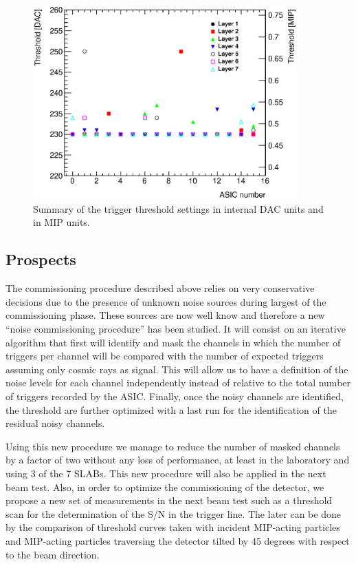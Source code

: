 \documentclass[a4paper,11pt]{article}
\begin{document}
\begin{figure}[!t]
  \centering
  \includegraphics[width=4in]{../figs/commissioning/threshold_chip.eps}
  \caption{Summary of the trigger threshold settings in internal DAC units and in MIP units.}
\label{trigger_thresholds}
\end{figure}


\subsection{Prospects}
\label{sec:comm_prospects}

The commissioning procedure described above relies on very conservative decisions
due to the presence of unknown noise sources during largest of the commissioning phase.
These sources are
now well know and therefore a new ``noise commissioning procedure'' has been studied.
It will consist on an iterative algorithm that first
will identify and mask the channels
in which the number of triggers per channel will be compared with the number of expected triggers
assuming only cosmic rays as signal. This will allow us to have a
definition of the noise levels for each channel independently
instead of relative to the total number of triggers recorded by
the ASIC. Finally, once the noisy channels
are identified, the threshold  are further optimized
with a last run for the identification of the residual noisy channels.

Using this new procedure we manage to reduce the number of masked channels by a factor of two
without any loss of performance, at least in the laboratory and using 3 of the 7 SLABs.
This new procedure will also be applied in the next beam test.
Also, in order to
optimize the commissioning of the detector,
we propose a new set of measurements in the next beam test such as
a threshold scan for the determination of the S/N in the trigger line. The later
can be done by the comparison of threshold curves taken with incident MIP-acting particles
and MIP-acting particles traversing the detector tilted by 45 degrees with respect to the beam direction.
\end{document}
